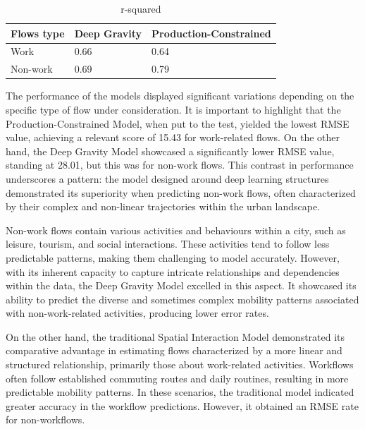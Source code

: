         \begin{table}[H]
        \centering
        \begin{tabular}{@{}lll@{}}
        \toprule
        \textbf{Flows type} & \textbf{Deep Gravity} & \textbf{Production-Constrained} \\ \midrule
        Work                & 0.66                  & 0.64                            \\
        Non-work            & 0.69                  & 0.79                            \\ \bottomrule
        \end{tabular}
            \caption{r-squared}
            \label{table: Table XX}
        \end{table}
    

    The performance of the models displayed significant variations depending on the specific type of flow under consideration. It is important to highlight that the Production-Constrained Model, when put to the test, yielded the lowest RMSE value, achieving a relevant score of 15.43 for work-related flows. On the other hand, the Deep Gravity Model showcased a significantly lower RMSE value, standing at 28.01, but this was for non-work flows. This contrast in performance underscores a pattern: the model designed around deep learning structures demonstrated its superiority when predicting non-work flows, often characterized by their complex and non-linear trajectories within the urban landscape.

    Non-work flows contain various activities and behaviours within a city, such as leisure, tourism, and social interactions. These activities tend to follow less predictable patterns, making them challenging to model accurately. However, with its inherent capacity to capture intricate relationships and dependencies within the data, the Deep Gravity Model excelled in this aspect. It showcased its ability to predict the diverse and sometimes complex mobility patterns associated with non-work-related activities, producing lower error rates.
    
    On the other hand, the traditional Spatial Interaction Model demonstrated its comparative advantage in estimating flows characterized by a more linear and structured relationship, primarily those about work-related activities. Workflows often follow established commuting routes and daily routines, resulting in more predictable mobility patterns. In these scenarios, the traditional model indicated greater accuracy in the workflow predictions. However, it obtained an RMSE rate for non-workflows.
    
